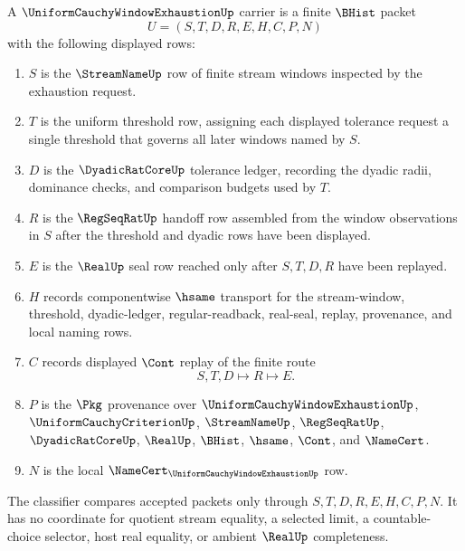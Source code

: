 \begin{definition}
\label{def:uniform-cauchy-window-exhaustion-carrier}
A $\UniformCauchyWindowExhaustionUp$ carrier is a finite $\BHist$ packet
$$
U=(S,T,D,R,E,H,C,P,N)
$$
with the following displayed rows:
\begin{enumerate}
\item $S$ is the $\StreamNameUp$ row of finite stream windows inspected by the exhaustion request.
\item $T$ is the uniform threshold row, assigning each displayed tolerance request a single threshold that governs all later windows named by $S$.
\item $D$ is the $\DyadicRatCoreUp$ tolerance ledger, recording the dyadic radii, dominance checks, and comparison budgets used by $T$.
\item $R$ is the $\RegSeqRatUp$ handoff row assembled from the window observations in $S$ after the threshold and dyadic rows have been displayed.
\item $E$ is the $\RealUp$ seal row reached only after $S,T,D,R$ have been replayed.
\item $H$ records componentwise $\hsame$ transport for the stream-window, threshold, dyadic-ledger, regular-readback, real-seal, replay, provenance, and local naming rows.
\item $C$ records displayed $\Cont$ replay of the finite route
$$
S,T,D \longmapsto R \longmapsto E .
$$
\item $P$ is the $\Pkg$ provenance over $\UniformCauchyWindowExhaustionUp$, $\UniformCauchyCriterionUp$, $\StreamNameUp$, $\RegSeqRatUp$, $\DyadicRatCoreUp$, $\RealUp$, $\BHist$, $\hsame$, $\Cont$, and $\NameCert$.
\item $N$ is the local $\NameCert_{\UniformCauchyWindowExhaustionUp}$ row.
\end{enumerate}
The classifier compares accepted packets only through $S,T,D,R,E,H,C,P,N$. It has no coordinate for quotient stream equality, a selected limit, a countable-choice selector, host real equality, or ambient $\RealUp$ completeness.
\end{definition}

